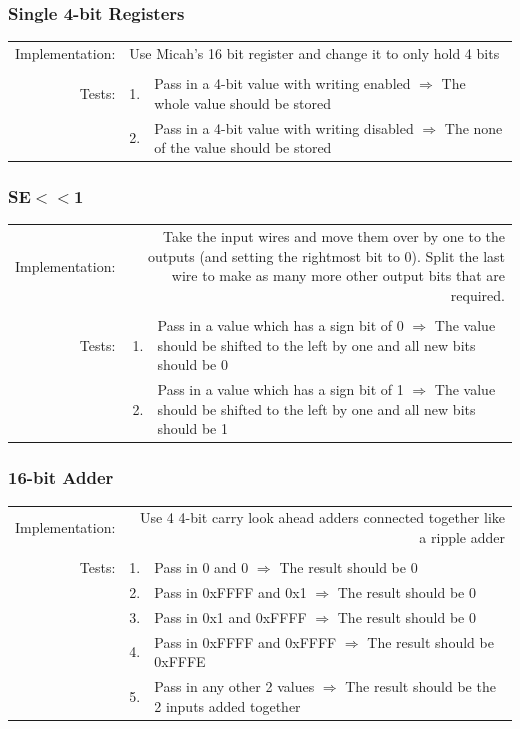 \documentclass{article}
\begin{document}
		\subsubsection{Single 4-bit Registers}
			\begin{tabular}{ r  r  p{12cm} }
				Implementation: & \multicolumn{2}{l}{Use Micah's 16 bit register and change it to only hold 4 bits}\\
				                &    & \\
				         Tests: & 1. & Pass in a 4-bit value with writing enabled $\Rightarrow$ The whole value should be stored\\
				                & 2. & Pass in a 4-bit value with writing disabled $\Rightarrow$ The none of the value should be stored\\
			\end{tabular}
		\subsubsection{SE$<<$1}
			\begin{tabular}{ r  r  p{12cm} }
				Implementation: & \multicolumn{2}{p{12.75cm}}{Take the input wires and move them over by one to the outputs (and setting the rightmost bit to 0).  Split the last wire to make as many more other output bits that are required.}\\
				                &    & \\
				         Tests: & 1. & Pass in a value which has a sign bit of 0 $\Rightarrow$ The value should be shifted to the left by one and all new bits should be 0\\
				                & 2. & Pass in a value which has a sign bit of 1 $\Rightarrow$ The value should be shifted to the left by one and all new bits should be 1\\
			\end{tabular}
		\subsubsection{16-bit Adder}
			\begin{tabular}{ r  r  p{12cm} }
				Implementation: & \multicolumn{2}{p{12.75cm}}{Use 4 4-bit carry look ahead adders connected together like a ripple adder}\\
				                &    & \\
				         Tests: & 1. & Pass in 0 and 0 $\Rightarrow$ The result should be 0\\
				                & 2. & Pass in 0xFFFF and 0x1 $\Rightarrow$ The result should be 0\\
				                & 3. & Pass in 0x1 and 0xFFFF $\Rightarrow$ The result should be 0\\
				                & 4. & Pass in 0xFFFF and 0xFFFF $\Rightarrow$ The result should be 0xFFFE\\
				                & 5. & Pass in any other 2 values $\Rightarrow$ The result should be the 2 inputs added together\\
			\end{tabular}
\end{document}
